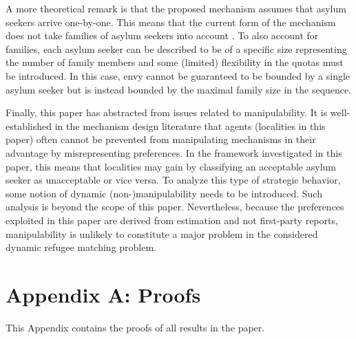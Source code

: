 \documentclass[12pt,fleqn]{article}
\begin{document}
A more theoretical remark is that the proposed mechanism assumes that asylum seekers arrive one-by-one. This means that the current form of the mechanism does not take families of asylum seekers into account \citep[see, e.g.,][for a mechanism that keeps families intact in house allocation problems with asylum seekers]{bib:AnderssonEhlers}. To also account for families, each asylum seeker can be described to be of a specific size representing the number of family members and some (limited) flexibility in the quotas must be introduced. In this case, envy cannot be guaranteed to be bounded by a single asylum seeker but is instead bounded by the maximal family size in the sequence.

Finally, this paper has abstracted from issues related to manipulability. It is  well-established in the mechanism design literature that agents (localities in this paper) often cannot be prevented from manipulating mechanisms in their advantage by misrepresenting preferences. In the framework investigated in this paper, this means that localities may gain by classifying an acceptable asylum seeker as unacceptable or vice versa. To analyze this type of strategic behavior, some notion of dynamic (non-)manipulability needs to be introduced. Such analysis is beyond the scope of this paper. Nevertheless, because the preferences exploited in this paper are derived from estimation and not first-party reports, manipulability is unlikely to constitute a major problem in the considered dynamic refugee matching problem.




\newpage

\section*{Appendix A: Proofs}
This Appendix contains the proofs of all results in the paper.

\medskip
\end{document}
